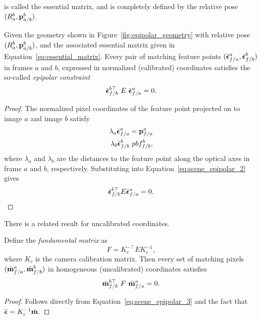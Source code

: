 is called the essential matrix, and is completely defined by the relative pose $(R_a^b, \mathbf{p}_{a/b}^b)$.  
\begin{theorem}
	Given the geometry shown in Figure~\ref{fig:epipolar_geometry} with relative pose $(R_a^b, \mathbf{p}_{a/b}^b)$, and the associated essential matrix given in Equation~\eqref{eq:essential_matrix}.  Every pair of matching feature points  $(\bar{\boldsymbol{\epsilon}}_{f/a}^a, \bar{\boldsymbol{\epsilon}}_{f/b}^b)$ in frames $a$ and $b$, expressed in normalized (calibrated) coordinates satisfies the so-called {\em epipolar constraint}
	\begin{equation}\label{eq:scene_epipolar_3}
	\bar{\epsilonbf}_{f/b}^{b\top} ~E~ \bar{\epsilonbf}_{f/a}^a = 0.
	\end{equation}
\end{theorem}
\begin{proof}
The normalized pixel coordinates of the feature point projected on to image $a$ and image $b$ satisfy
\begin{align*}
\lambda_a \bar{\boldsymbol{\epsilon}}_{f/a}^a &= \mathbf{p}_{f/a}^a \\
\lambda_b \bar{\boldsymbol{\epsilon}}_{f/b}^b & \ pbf_{f/b}^b,
\end{align*}
where $\lambda_a$ and $\lambda_b$ are the distances to the feature point along the optical axes in frame $a$ and $b$, respectively.  Substituting into Equation~\eqref{eq:scene_epipolar_2} gives
\begin{equation}\label{eq:scene_epipolar_3}
\bar{\epsilonbf}_{f/b}^{b\top} E \bar{\epsilonbf}_{f/a}^a = 0.
\end{equation}
\end{proof}

There is a related result for uncalibrated coordinates.
\begin{theorem}
	Define the {\em fundamental matrix} as
	\begin{equation}\label{eq:scene_fundamental_matrix}
	F = K_c^{-\top} E K_c^{-1},
	\end{equation}
	where $K_c$ is the camera calibration matrix.  Then every set of matching pixels $(\bar{\mathbf{m}}_{f/a}^a, \bar{\mathbf{m}}_{f/b}^b)$ in homogeneous (uncalibrated) coordinates satisfies
	\begin{equation}\label{eq:scene_epipolar_4}
	\bar{\mbf}_{f/b}^{b\top} ~F~ \bar{\mbf}_{f/a}^a = 0.
	\end{equation}
\end{theorem}
\begin{proof}
	Follows directly from Equation~\eqref{eq:scene_epipolar_3} and the fact that $\bar{\boldsymbol{\epsilon}} = K_c^{-1} \bar{\mathbf{m}}$.
\end{proof}

